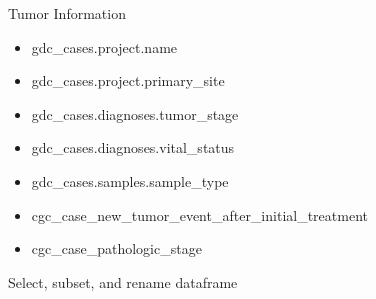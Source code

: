 \documentclass{article}
\providecommand{\tightlist}{%
      \setlength{\itemsep}{0pt}\setlength{\parskip}{0pt}}
\begin{document}
Tumor Information

\begin{itemize}
\tightlist
\item
  gdc\_cases.project.name
\item
  gdc\_cases.project.primary\_site
\item
  gdc\_cases.diagnoses.tumor\_stage
\item
  gdc\_cases.diagnoses.vital\_status
\item
  gdc\_cases.samples.sample\_type
\item
  cgc\_case\_new\_tumor\_event\_after\_initial\_treatment
\item
  cgc\_case\_pathologic\_stage
\end{itemize}

    Select, subset, and rename dataframe
\end{document}
